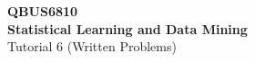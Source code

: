 \documentclass[12pt, answers]{exam}
\begin{document}
\begin{center}
{\Large \textbf{QBUS6810} \\\textbf{Statistical Learning and Data Mining}}\\ \bigskip \large{Tutorial 6 (Written Problems)}
\end{center}



\end{document}
